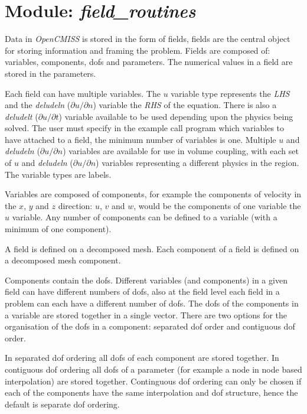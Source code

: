 \section{Module: \emph{field\_routines}}
\label{sec:fieldroutines}

Data in \emph{OpenCMISS} is stored in the form of fields, fields are the 
central object for storing information and framing the problem. Fields are 
composed of: variables, components, dofs and parameters. The numerical 
values in a field are stored in the parameters.

Each field can have multiple variables. The $u$ variable type represents 
the \emph{LHS} and the \emph{deludeln} ($\partial{u}/\partial{n}$) variable 
the \emph{RHS} of the equation. There is also a \emph{deludelt} 
($\partial{u}/\partial{t}$) variable available to be used depending upon 
the physics being solved. The user must specify in the example call program 
which variables to have attached to a field, the minimum number of variables 
is one. Multiple $u$ and \emph{deludeln} ($\partial{u}/\partial{n}$) 
variables are available for use in volume coupling, with each set of $u$ 
and \emph{deludeln} ($\partial{u}/\partial{n}$) variables representing a 
different physics in the region. The variable types are labels. 

Variables are composed of components, for example the components of velocity 
in the $x$, $y$ and $z$ direction: $u$, $v$ and $w$, would be the components 
of one variable the $u$ variable. Any number of components can be defined to a
variable (with a minimum of one component). 

A field is defined on a decomposed mesh. Each component of a field is defined 
on a decomposed mesh component.

Components contain the dofs. Different variables (and components) in a given 
field can have different numbers of dofs, also at the field level each field 
in a problem can each have a different number of dofs. The dofs of the 
components in a variable are stored together in a single vector. There are 
two options for the organisation of the dofs in a component: separated dof 
order and contiguous dof order. 

In separated dof ordering all dofs of each component are stored together.
In contiguous dof ordering all dofs of a parameter (for example a node in 
node based interpolation) are stored together. Continguous dof ordering can 
only be chosen if each of the components have the same interpolation and dof 
structure, hence the default is separate dof ordering.

